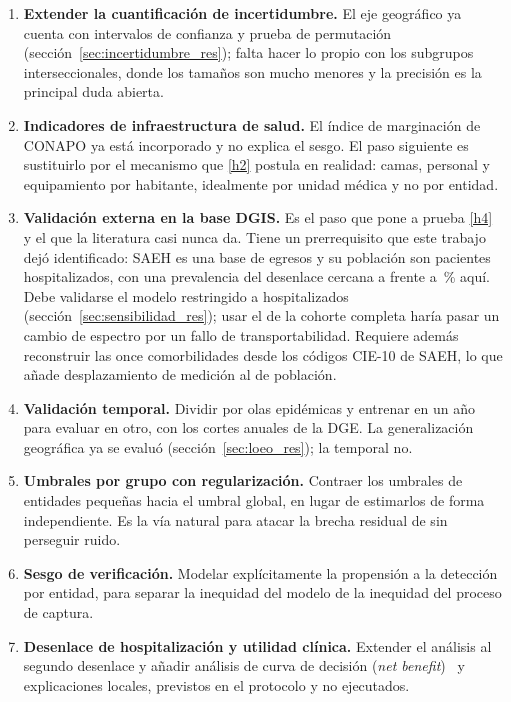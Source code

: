 \begin{enumerate}[leftmargin=*]
  \item \textbf{Extender la cuantificación de incertidumbre.} El eje geográfico
    ya cuenta con intervalos de confianza y prueba de permutación
    (sección~\ref{sec:incertidumbre_res}); falta hacer lo propio con los subgrupos
    interseccionales, donde los tamaños son mucho menores y la precisión es la
    principal duda abierta.
  \item \textbf{Indicadores de infraestructura de salud.} El índice de
    marginación de CONAPO ya está incorporado y no explica el sesgo. El paso
    siguiente es sustituirlo por el mecanismo que \ref{h2} postula en realidad:
    camas, personal y equipamiento por habitante, idealmente por unidad médica y
    no por entidad.
  \item \textbf{Validación externa en la base DGIS.} Es el paso que pone a prueba
    \ref{h4} y el que la literatura casi nunca da. Tiene un prerrequisito que este
    trabajo dejó identificado: SAEH es una base de egresos y su población son
    pacientes hospitalizados, con una prevalencia del desenlace cercana a
    \hospPrev{} frente a \cohorteTasaDef\,\% aquí. Debe validarse el modelo
    restringido a hospitalizados (sección~\ref{sec:sensibilidad_res}); usar el de la
    cohorte completa haría pasar un cambio de espectro por un fallo de
    transportabilidad. Requiere además reconstruir las once comorbilidades desde
    los códigos CIE-10 de SAEH, lo que añade desplazamiento de medición al de
    población.
  \item \textbf{Validación temporal.} Dividir por olas epidémicas y entrenar en un
    año para evaluar en otro, con los cortes anuales de la DGE. La generalización
    geográfica ya se evaluó (sección~\ref{sec:loeo_res}); la temporal no.
  \item \textbf{Umbrales por grupo con regularización.} Contraer los umbrales de
    entidades pequeñas hacia el umbral global, en lugar de estimarlos de forma
    independiente. Es la vía natural para atacar la brecha residual de \gapPost{}
    sin perseguir ruido.
  \item \textbf{Sesgo de verificación.} Modelar explícitamente la propensión a la
    detección por entidad, para separar la inequidad del modelo de la inequidad del
    proceso de captura.
  \item \textbf{Desenlace de hospitalización y utilidad clínica.} Extender el
    análisis al segundo desenlace y añadir análisis de curva de decisión
    (\emph{net benefit})~\parencite{vickers2006} y explicaciones locales, previstos en
    el protocolo y no ejecutados.
\end{enumerate}
